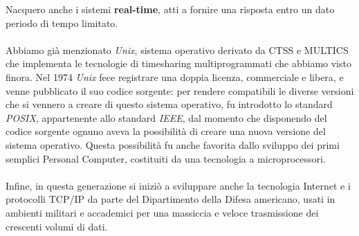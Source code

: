 \documentclass[12pt, letterpaper]{article}
\begin{document}
Nacquero anche i sistemi \textbf{real-time}, atti a fornire una risposta entro un dato periodo di tempo limitato. \\\\
Abbiamo già menzionato \textit{Unix}, sistema operativo derivato da CTSS e MULTICS che implementa le tecnologie di timesharing multiprogrammati che abbiamo visto finora. Nel 1974 \textit{Unix} fece registrare una doppia licenza, commerciale e libera, e venne pubblicato il suo codice sorgente: per rendere compatibili le diverse versioni che si vennero a creare di questo sistema operativo, fu introdotto lo standard \textit{POSIX}, appartenente allo standard \textit{IEEE}, dal momento che disponendo del codice sorgente ognuno aveva la possibilità di creare una nuova versione del sistema operativo. Questa possibilità fu anche favorita dallo sviluppo dei primi semplici Personal Computer, costituiti da una tecnologia a microprocessori. \\\\
Infine, in questa generazione si iniziò a sviluppare anche la tecnologia Internet e i protocolli TCP/IP da parte del Dipartimento della Difesa americano, usati in ambienti militari e accademici per una massiccia e veloce trasmissione dei crescenti volumi di dati.
\end{document}
